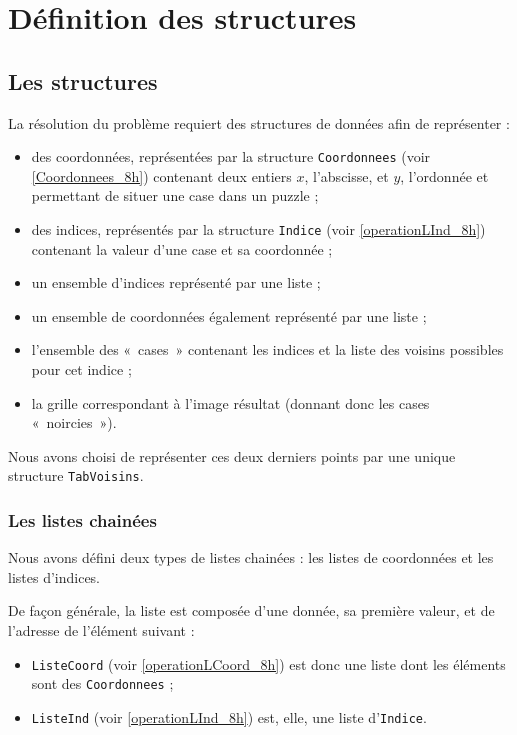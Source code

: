 \chapter{Définition des structures}


\section{Les structures}
La résolution du problème requiert des structures de données afin de représenter :
\begin{itemize}
\item des coordonnées, représentées par la structure \verb$Coordonnees$ (voir \ref{Coordonnees_8h}) contenant deux entiers $x$, l'abscisse, et $y$, l'ordonnée et permettant de situer une case dans un puzzle ;
\item des indices, représentés par la structure \verb$Indice$ (voir \ref{operationLInd_8h}) contenant la valeur d'une case et sa coordonnée ;
\item un ensemble d'indices représenté par une liste ;
\item un ensemble de coordonnées également représenté par une liste ;
\item l'ensemble des «~cases~» contenant les indices et la liste des voisins possibles pour cet indice ;
\item la grille correspondant à l'image résultat (donnant donc les cases «~noircies~»).
\end{itemize}
Nous avons choisi de représenter ces deux derniers points par une unique structure \verb$TabVoisins$.

\subsection{Les listes chainées}
Nous avons défini deux types de listes chainées : les listes de coordonnées et les listes d'indices.

De façon générale, la liste est composée d'une donnée, sa première valeur, et de l'adresse de l'élément suivant :
\begin{itemize}
\item \verb$ListeCoord$ (voir \ref{operationLCoord_8h}) est donc une liste dont les éléments sont des \verb$Coordonnees$ ;
\item \verb$ListeInd$ (voir \ref{operationLInd_8h}) est, elle, une liste d'\verb$Indice$.
\end{itemize}

